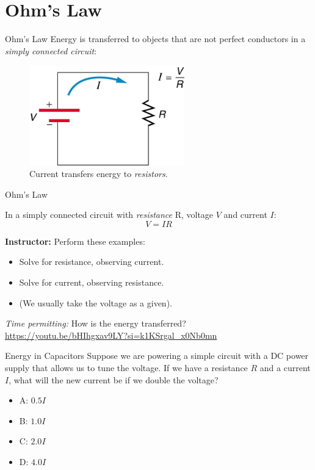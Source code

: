 \documentclass{beamer}
\begin{document}
\section{Ohm's Law}

\begin{frame}{Ohm's Law}
\small
Energy is transferred to objects that are not perfect conductors in a \textit{simply connected circuit}:
\begin{figure}
\centering
\includegraphics[width=0.6\textwidth]{figures/simple.png}
\caption{\label{fig:simple} Current transfers energy to \textit{resistors}.}
\end{figure}
\end{frame}

\begin{frame}{Ohm's Law}
\begin{tcolorbox}[colback=white,colframe=gray,title=Ohm's Law]
\alert{In a simply connected circuit with \textit{resistance} R, voltage $V$ and current $I$:
\begin{equation}
V = I R
\end{equation}}
\end{tcolorbox}
\textbf{Instructor:} Perform these examples:
\begin{itemize}
\item Solve for resistance, observing current.
\item Solve for current, observing resistance.
\item (We usually take the voltage as a given).
\end{itemize}
\footnotesize
\textit{Time permitting:} How is the energy transferred? \\
\url{https://youtu.be/bHIhgxav9LY?si=k1KSrgal_x0Nb0mn}
\end{frame}

\begin{frame}{Energy in Capacitors}
Suppose we are powering a simple circuit with a DC power supply that allows us to tune the voltage.  If we have a resistance $R$ and a current $I$, what will the new current be if we double the voltage?
\begin{itemize}
\item A: $0.5 I$
\item B: $1.0 I$
\item C: $2.0 I$
\item D: $4.0 I$
\end{itemize}
\end{frame}
\end{document}
